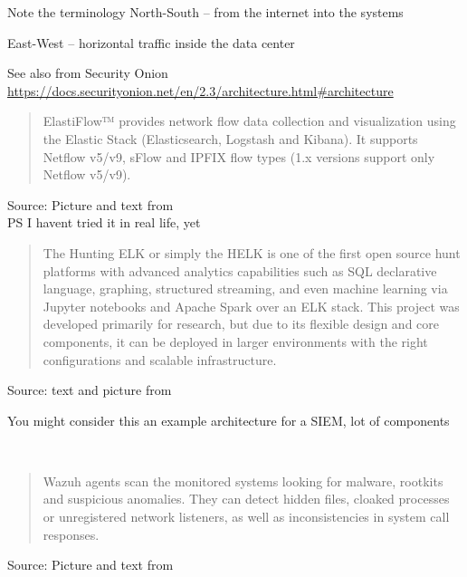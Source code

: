 \documentclass[Screen16to9,17pt]{foils}
\begin{document}
\begin{list2}
\item Note the terminology North-South -- from the internet into the systems
\item East-West -- horizontal traffic inside the data center
\item See also from Security Onion \url{https://docs.securityonion.net/en/2.3/architecture.html#architecture}
\end{list2}





\begin{quote}
  ElastiFlow™ provides network flow data collection and visualization using the Elastic Stack (Elasticsearch, Logstash and Kibana). It supports Netflow v5/v9, sFlow and IPFIX flow types (1.x versions support only Netflow v5/v9).
\end{quote}
Source: Picture and text from  \\
PS I havent tried it in real life, yet



\begin{quote}\small
The Hunting ELK or simply the HELK is one of the first open source hunt platforms with advanced analytics capabilities such as SQL declarative language, graphing, structured streaming, and even machine learning via Jupyter notebooks and Apache Spark over an ELK stack. This project was developed primarily for research, but due to its flexible design and core components, it can be deployed in larger environments with the right configurations and scalable infrastructure.
\end{quote}
Source: text and picture from 

\begin{list2}
\item You might consider this an example architecture for a SIEM, lot of components
\end{list2}



~

\begin{quote}\small
Wazuh agents scan the monitored systems looking for malware, rootkits and suspicious anomalies. They can detect hidden files, cloaked processes or unregistered network listeners, as well as inconsistencies in system call responses.
\end{quote}
Source: Picture and text from 
\end{document}
